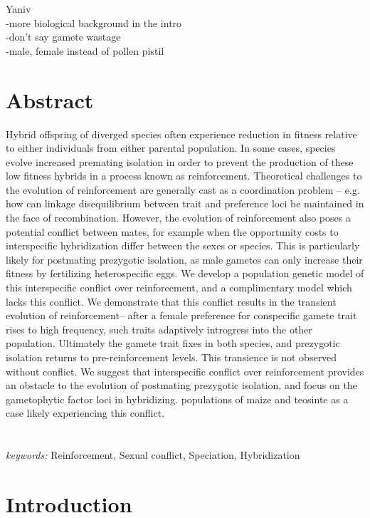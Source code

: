 \documentclass[11pt]{article}
\begin{document}
Yaniv\\
-more biological background in the intro\\
-don't say gamete wastage\\
-male, female instead of pollen pistil\\


\section*{Abstract}

Hybrid offspring of diverged species often experience reduction in fitness relative to either individuals from either parental population. In some cases, species evolve increased premating isolation in order to prevent the production of these low fitness hybrids in a process known as reinforcement. Theoretical challenges to the evolution of reinforcement are generally cast as a coordination problem – e.g. how can linkage disequilibrium between trait and preference loci be maintained in the face of recombination.  However, the evolution of reinforcement also poses a potential conflict between mates, for example when the opportunity costs to interspecific hybridization differ between the sexes or species. This is particularly likely for postmating prezygotic isolation, as male gametes can only increase their fitness by fertilizing heterospecific eggs. We develop a population genetic model of this interspecific conflict over reinforcement, and a complimentary model which lacks this conflict. We demonstrate that this conflict results in the transient evolution of reinforcement– after a female preference for conspecific gamete trait rises to high frequency, such traits adaptively introgress into the other population. Ultimately the gamete trait fixes in both species, and prezygotic isolation returns to pre-reinforcement levels. This transience is not observed without conflict. We suggest that interspecific conflict over reinforcement provides an obstacle to the evolution of postmating prezygotic isolation, and focus on the gametophytic factor loci in hybridizing. populations of maize and teosinte as a case likely experiencing this conflict. 
\\ 
\\ 
\\ 
\textit{keywords:} Reinforcement, Sexual conflict, Speciation, Hybridization 

\newpage

\section*{Introduction}
\end{document}
